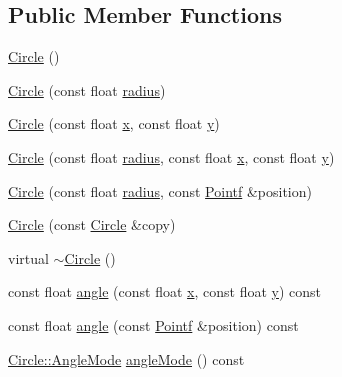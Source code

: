 \subsection*{Public Member Functions}
\begin{DoxyCompactItemize}
\item 
\hyperlink{classprism_1_1_circle_aff41793f64e90d15a4d89851b1a6b011}{Circle} ()
\item 
\hyperlink{classprism_1_1_circle_a4101ea55c7d90b63648742ef22460150}{Circle} (const float \hyperlink{classprism_1_1_circle_a75afa2c59f92909d6b6edcec338030fb}{radius})
\item 
\hyperlink{classprism_1_1_circle_aa6252ad78c2f76a1a4e15f93087bb2c6}{Circle} (const float \hyperlink{classprism_1_1_circle_ae1f729f8fa34605123628e67b230b6be}{x}, const float \hyperlink{classprism_1_1_circle_a6edc045d912b0d278bd0673af028290e}{y})
\item 
\hyperlink{classprism_1_1_circle_afb53c6e58fcd6cbc9effbe082c580892}{Circle} (const float \hyperlink{classprism_1_1_circle_a75afa2c59f92909d6b6edcec338030fb}{radius}, const float \hyperlink{classprism_1_1_circle_ae1f729f8fa34605123628e67b230b6be}{x}, const float \hyperlink{classprism_1_1_circle_a6edc045d912b0d278bd0673af028290e}{y})
\item 
\hyperlink{classprism_1_1_circle_af972289bbd2440b0436ad024634fb8d8}{Circle} (const float \hyperlink{classprism_1_1_circle_a75afa2c59f92909d6b6edcec338030fb}{radius}, const \hyperlink{classprism_1_1_pointf}{Pointf} \&position)
\item 
\hyperlink{classprism_1_1_circle_a95651a90ca498f4b811b8dee5c56dfba}{Circle} (const \hyperlink{classprism_1_1_circle}{Circle} \&copy)
\item 
virtual \hyperlink{classprism_1_1_circle_aff162a19ac60d0cefc5e5cc2ea397de7}{$\sim$\+Circle} ()
\item 
const float \hyperlink{classprism_1_1_circle_ad4b91cf13b593a67abf9782db3fec5d9}{angle} (const float \hyperlink{classprism_1_1_circle_ae1f729f8fa34605123628e67b230b6be}{x}, const float \hyperlink{classprism_1_1_circle_a6edc045d912b0d278bd0673af028290e}{y}) const 
\item 
const float \hyperlink{classprism_1_1_circle_aeee2c0f59b94feb4dd3535950157d614}{angle} (const \hyperlink{classprism_1_1_pointf}{Pointf} \&position) const 
\item 
\hyperlink{classprism_1_1_circle_a74c7c532b4eb120b9227b7fabeffe6ac}{Circle\+::\+Angle\+Mode} \hyperlink{classprism_1_1_circle_a0aa261d16ff55088e5695820fa95e09b}{angle\+Mode} () const 

\end{DoxyCompactItemize}

